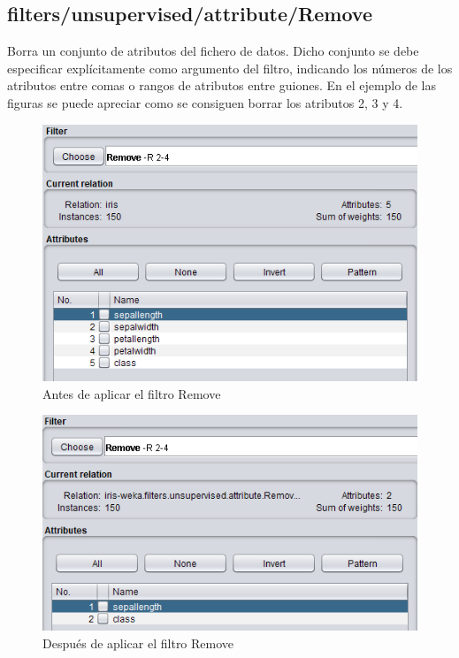 \documentclass[11pt,twoside,a4paper]{book}
\begin{document}
\subsection{filters/unsupervised/attribute/Remove}
Borra un conjunto de atributos del fichero de datos. Dicho conjunto se debe especificar explícitamente como argumento del filtro, indicando los números de los atributos entre comas o rangos de atributos entre guiones. En el ejemplo de las figuras se puede apreciar como se consiguen borrar los atributos 2, 3 y 4.

\begin{figure}[H]
   \includegraphics[width=\textwidth]{remove1.png}
	\caption{Antes de aplicar el filtro Remove}
	\label{Fig21}
\end{figure}
\begin{figure}[H]
   \includegraphics[width=\textwidth]{remove2.png}
	\caption{Después de aplicar el filtro Remove}
	\label{Fig22}
\end{figure}
\end{document}
